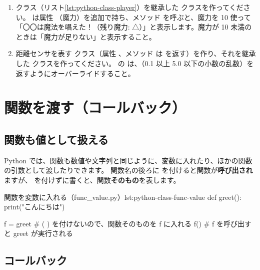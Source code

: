 \begin{exercise}
\begin{enumerate}
  \item {} クラス（リスト\ref{lst:python-class-player}）を継承した  クラスを作ってください。 は属性 （魔力）を追加で持ち、メソッド  を呼ぶと、魔力を 10 使って「〇〇は魔法を唱えた！（残り魔力: △）」と表示します。魔力が 10 未満のときは「魔力が足りない」と表示すること。
  \item 距離センサを表す  クラス（属性 、メソッド  は  を返す）を作り、それを継承した  クラスを作ってください。 の  は、（0.1 以上 5.0 以下の小数の乱数）を返すようにオーバーライドすること。
\end{enumerate}
\end{exercise}

\section{関数を渡す（コールバック）}
\label{sec:python-class-callback}

\subsection{関数も値として扱える}

Python では、関数も数値や文字列と同じように、変数に入れたり、ほかの関数の引数として渡したりできます。
関数名の後ろに \cmd{( )} を付けると関数が\textbf{呼び出され}ますが、\cmd{( )} を付けずに書くと、関数\textbf{そのもの}を表します。

\begin{codelisting}[style=python]{関数を変数に入れる（func\_value.py）}{lst:python-class-func-value}
def greet():
    print("こんにちは")


f = greet   # ( ) を付けないので、関数そのものを f に入れる
f()         # f を呼び出すと greet が実行される
\end{codelisting}


\subsection{コールバック}

